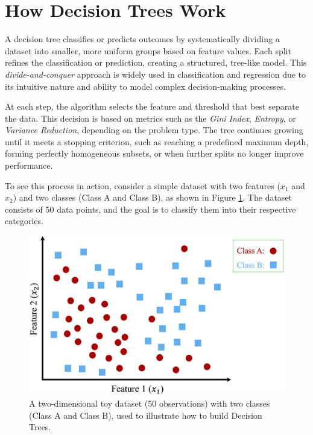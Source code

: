 \documentclass[
  11pt,
]{book}
\theoremstyle{definition}
\theoremstyle{definition}
\theoremstyle{definition}
\theoremstyle{definition}
\theoremstyle{remark}
\begin{document}
\section{How Decision Trees Work}\label{how-decision-trees-work}

A decision tree classifies or predicts outcomes by systematically dividing a dataset into smaller, more uniform groups based on feature values. Each split refines the classification or prediction, creating a structured, tree-like model. This \emph{divide-and-conquer} approach is widely used in classification and regression due to its intuitive nature and ability to model complex decision-making processes.

At each step, the algorithm selects the feature and threshold that best separate the data. This decision is based on metrics such as the \emph{Gini Index}, \emph{Entropy}, or \emph{Variance Reduction}, depending on the problem type. The tree continues growing until it meets a stopping criterion, such as reaching a predefined maximum depth, forming perfectly homogeneous subsets, or when further splits no longer improve performance.

To see this process in action, consider a simple dataset with two features (\(x_1\) and \(x_2\)) and two classes (Class A and Class B), as shown in Figure \ref{fig:tree-1}. The dataset consists of 50 data points, and the goal is to classify them into their respective categories.

\begin{figure}[H]

{\centering \includegraphics[width=0.7\linewidth]{images/ch11_ex_tree_1} 

}

\caption{A two-dimensional toy dataset (50 observations) with two classes (Class A and Class B), used to illustrate how to build Decision Trees.}\label{fig:tree-1}
\end{figure}
\end{document}
